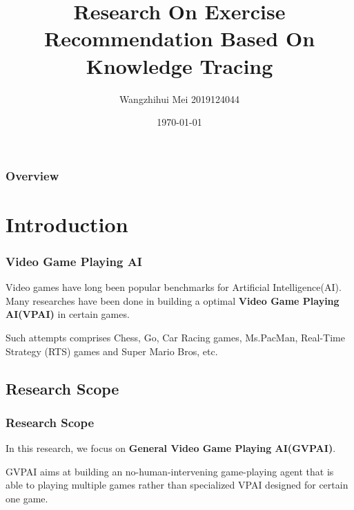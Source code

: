 \documentclass{beamer}
\title[Short title]{Research On Exercise Recommendation Based On Knowledge Tracing} %
\author{ Wangzhihui Mei 2019124044} %
\institute[JI] %
{
CCNU-UOW JI \\ %
\medskip
\textit{maywzh@gmail.com} %
}
\date{\today} %
\begin{document}
\begin{frame}
  \titlepage %
\end{frame}

\begin{frame}
  \frametitle{Overview} %
  \tableofcontents %
\end{frame}


\section{Introduction}
\begin{frame}
  \frametitle{Video Game Playing AI}
  Video games have long been popular benchmarks for Artificial Intelligence(AI)\cite{1}. Many researches have been done in building a optimal \textbf{Video Game Playing AI(VPAI)}  in certain games.

  Such attempts comprises Chess, Go, Car Racing games, Ms.PacMan, Real-Time Strategy (RTS) games and Super Mario Bros, etc.
\end{frame}

\subsection{Research Scope}
\begin{frame}
  \frametitle{Research Scope}
  In this research, we focus on \textbf{General Video Game Playing AI(GVPAI)}.

  GVPAI aims at building an no-human-intervening game-playing agent that is able to playing multiple games rather than specialized VPAI designed for certain one game\cite{1}.

\end{frame}
\end{document}
